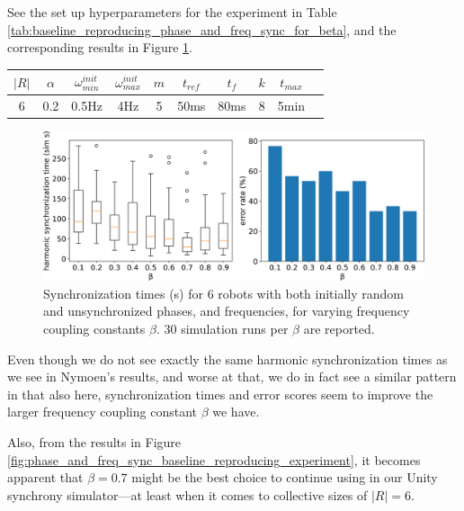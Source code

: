 		See the set up hyperparameters for the experiment in Table \ref{tab:baseline_reproducing_phase_and_freq_sync_for_beta}, and the corresponding results in Figure \ref{fig:baseline_reproducing_phase_and_freq_sync_for_beta}.
		
		\begin{center}
		\begin{tabular}{ |c|c|c|c|c|c|c|c|c|c| } 
		\hline
		$|R|$ & $\alpha$ & $\omega_{min}^{init}$ & $\omega_{max}^{init}$ & $m$ & $t_{ref}$ & $t_f$ & $k$ & $t_{max}$ \\
		\hline
		6 & 0.2 & 0.5Hz & 4Hz & 5 & 50ms & 80ms & 8 & 5min \\
		\hline
		\end{tabular}
		\label{tab:baseline_reproducing_phase_and_freq_sync_for_beta}
		\end{center}
		
		\begin{figure}[ht!]
			\centering
			\includegraphics[width=\linewidth]{Assets/DocSegments/Chapters/ExperimentsAndResults/Figures/PerfScores/baseline_reproducing_phase_and_freq_sync_for_beta.pdf}
			\caption{Synchronization times (s) for 6 robots with both initially random and unsynchronized phases, and frequencies, for varying frequency coupling constants $\beta$. 30 simulation runs per $\beta$ are reported.}
			\label{fig:baseline_reproducing_phase_and_freq_sync_for_beta}
		\end{figure}
		
		Even though we do not see exactly the same harmonic synchronization times as we see in Nymoen's results, and worse at that, we do in fact see a similar pattern in that also here, synchronization times and error scores seem to improve the larger frequency coupling constant $\beta$ we have.
		
		Also, from the results in Figure \ref{fig:phase_and_freq_sync_baseline_reproducing_experiment}, it becomes apparent that $\beta=0.7$ might be the best choice to continue using in our Unity synchrony simulator—at least when it comes to collective sizes of $|R|=6$.
		
